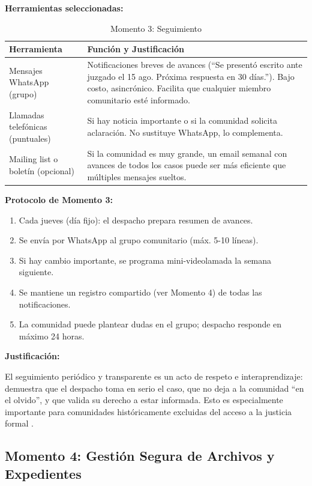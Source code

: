 ﻿\documentclass[
  spanish,
  letterpaper, oneside
]{article}
\begin{document}
\textbf{Herramientas seleccionadas:}

\begin{table}[h]
\centering
\small
\begin{tabular}{@{}lp{8cm}@{}}
\toprule
\textbf{Herramienta} & \textbf{Función y Justificación} \\
\midrule
Mensajes WhatsApp (grupo) & Notificaciones breves de avances (``Se presentó escrito ante juzgado 
el 15 ago. Próxima respuesta en 30 días.''). Bajo costo, asincrónico. Facilita que cualquier 
miembro comunitario esté informado. \\
\midrule
Llamadas telefónicas (puntuales) & Si hay noticia importante o si la comunidad solicita 
aclaración. No sustituye WhatsApp, lo complementa. \\
\midrule
Mailing list o boletín (opcional) & Si la comunidad es muy grande, un email semanal con 
avances de todos los casos puede ser más eficiente que múltiples mensajes sueltos. \\
\bottomrule
\end{tabular}
\caption{Momento 3: Seguimiento}
\label{tab:momento3}
\end{table}

\textbf{Protocolo de Momento 3:}

\begin{enumerate}
  \item Cada jueves (día fijo): el despacho prepara resumen de avances.
  \item Se envía por WhatsApp al grupo comunitario (máx. 5-10 líneas).
  \item Si hay cambio importante, se programa mini-videolamada la semana siguiente.
  \item Se mantiene un registro compartido (ver Momento 4) de todas las notificaciones.
  \item La comunidad puede plantear dudas en el grupo; despacho responde en máximo 24 horas.
\end{enumerate}

\textbf{Justificación:}

El seguimiento periódico y transparente es un acto de respeto e interaprendizaje: demuestra 
que el despacho toma en serio el caso, que no deja a la comunidad ``en el olvido'', y que 
valida su derecho a estar informada. Esto es especialmente importante para comunidades 
históricamente excluidas del acceso a la justicia formal \cite{silva2015metodologias}.

\subsection{Momento 4: Gestión Segura de Archivos y Expedientes}
\end{document}
